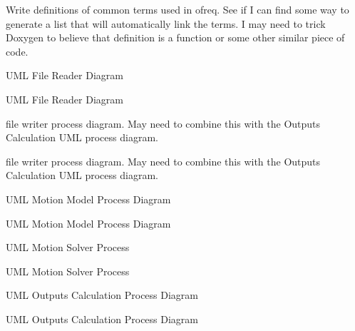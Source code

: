 
\begin{DoxyRefList}
\item[\label{todo__todo000001}%
\hypertarget{todo__todo000001}{}%
Page \hyperlink{definitions}{Definitions} ]Write definitions of common terms used in ofreq. See if I can find some way to generate a list that will automatically link the terms. I may need to trick Doxygen to believe that definition is a function or some other similar piece of code. 
\item[\label{todo__todo000002}%
\hypertarget{todo__todo000002}{}%
Page \hyperlink{_u_m_l__file_reader}{File Reader Process} ]U\-M\-L File Reader Diagram 
\item[\label{todo__todo000011}%
\hypertarget{todo__todo000011}{}%
Page \hyperlink{uml_filereader}{File Reader Process} ]U\-M\-L File Reader Diagram 
\item[\label{todo__todo000009}%
\hypertarget{todo__todo000009}{}%
Page \hyperlink{_u_m_l__writing_files}{File Writer Process} ]file writer process diagram. May need to combine this with the Outputs Calculation U\-M\-L process diagram. 
\item[\label{todo__todo000024}%
\hypertarget{todo__todo000024}{}%
Page \hyperlink{uml_writingfiles}{File Writer Process} ]file writer process diagram. May need to combine this with the Outputs Calculation U\-M\-L process diagram. 
\item[\label{todo__todo000013}%
\hypertarget{todo__todo000013}{}%
Page \hyperlink{uml_motionmodel}{Motion Model Process} ]U\-M\-L Motion Model Process Diagram 
\item[\label{todo__todo000003}%
\hypertarget{todo__todo000003}{}%
Page \hyperlink{_u_m_l__motion_model}{Motion Model Process} ]U\-M\-L Motion Model Process Diagram 
\item[\label{todo__todo000004}%
\hypertarget{todo__todo000004}{}%
Page \hyperlink{_u_m_l__motion_solver}{Motion Solver Process} ]U\-M\-L Motion Solver Process 
\item[\label{todo__todo000014}%
\hypertarget{todo__todo000014}{}%
Page \hyperlink{uml_motionsolver}{Motion Solver Process} ]U\-M\-L Motion Solver Process 
\item[\label{todo__todo000016}%
\hypertarget{todo__todo000016}{}%
Page \hyperlink{uml_outputscalculation}{Outputs Calculation} ]U\-M\-L Outputs Calculation Process Diagram 
\item[\label{todo__todo000005}%
\hypertarget{todo__todo000005}{}%
Page \hyperlink{_u_m_l__outputs_calculation}{Outputs Calculation} ]U\-M\-L Outputs Calculation Process Diagram 

\end{DoxyRefList}

